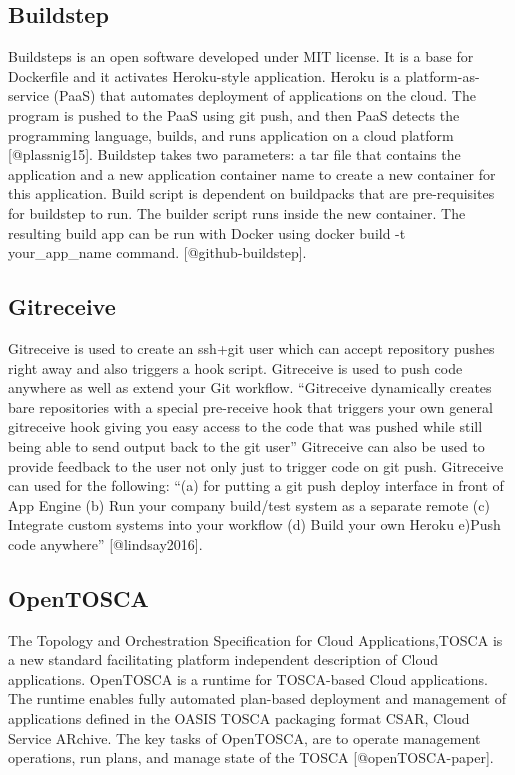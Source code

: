      
\subsection{Buildstep}
     
Buildsteps is an open software developed under MIT license.  It is a
base for Dockerfile and it activates Heroku-style application. Heroku
is a platform-as-service (PaaS) that automates deployment of
applications on the cloud. The program is pushed to the PaaS using git
push, and then PaaS detects the programming language, builds, and runs
application on a cloud platform [@plassnig15].  Buildstep takes
two parameters: a tar file that contains the application and a new
application container name to create a new container for this
application. Build script is dependent on buildpacks that are
pre-requisites for buildstep to run. The builder script runs inside
the new container.  The resulting build app can be run with Docker
using docker build -t your\_app\_name
command. [@github-buildstep].

\subsection{Gitreceive}

Gitreceive is used to create an ssh+git user which can accept
repository pushes right away and also triggers a hook
script. Gitreceive is used to push code anywhere as well as extend
your Git workflow. ``Gitreceive dynamically creates bare repositories
with a special pre-receive hook that triggers your own general
gitreceive hook giving you easy access to the code that was pushed
while still being able to send output back to the git user''
Gitreceive can also be used to provide feedback to the user not only
just to trigger code on git push.  Gitreceive can used for the
following: ``(a) for putting a git push deploy interface in front of
App Engine (b) Run your company build/test system as a separate remote
(c) Integrate custom systems into your workflow (d) Build your own
Heroku e)Push code anywhere'' [@lindsay2016].
     
\subsection{OpenTOSCA}

The Topology and Orchestration Specification for Cloud
Applications,TOSCA is a new standard facilitating platform independent
description of Cloud applications. OpenTOSCA is a runtime for
TOSCA-based Cloud applications. The runtime enables fully automated
plan-based deployment and management of applications defined in the
OASIS TOSCA packaging format CSAR, Cloud Service ARchive.  The key
tasks of OpenTOSCA, are to operate management operations, run plans,
and manage state of the TOSCA [@openTOSCA-paper].
     
